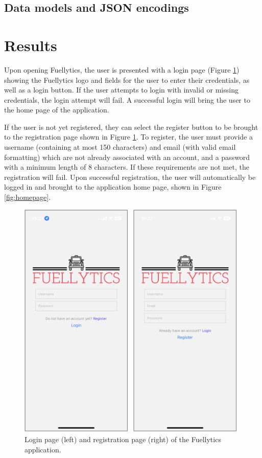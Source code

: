 \documentclass[11pt, oneside]{article}
\begin{document}
\subsection{Data models and JSON encodings}

\section{Results}
Upon opening Fuellytics, the user is presented with a login page (Figure \ref*{fig:login-register}) showing the Fuellytics logo and fields for the user to enter their credentials, as well as a login button. If the user attempts to login with invalid or missing credentials, the login attempt will fail.  A successful login will bring the user to the home page of the application.

If the user is not yet registered, they can select the register button to be brought to the registration page shown in Figure \ref*{fig:login-register}.  To register, the user must provide a username (containing at most 150 characters) and email (with valid email formatting) which are not already associated with an account, and a password with a minimum length of 8 characters.  If these requirements are not met, the registration will fail. Upon successful registration, the user will automatically be logged in and brought to the application home page, shown in Figure \ref*{fig:homepage}.
\begin{figure}[H]
\centerline{\includegraphics[width=11cm]{img/login-register.png}}
\caption{\label{fig:login-register} Login page (left) and registration page (right) of the Fuellytics application.}
\end{figure}
\end{document}

